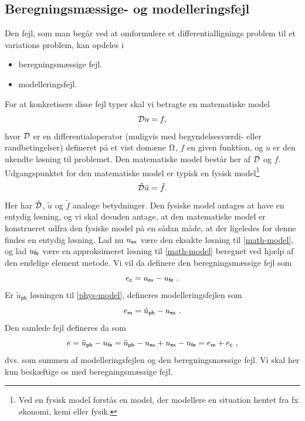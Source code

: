 \subsection{Beregningsmæssige- og modelleringsfejl}
Den fejl, som man begår ved at omformulere et differentiallignings
problem til et variations problem, kan opdeles i 
\begin{itemize}
  \item beregningsmæssige fejl.
  \item modelleringsfejl.
\end{itemize}
For at konkretisere disse fejl typer skal vi betragte en matematiske model
\begin{equation} \label{math-model}
  {\mathcal{D}} u=f,
\end{equation}
hvor ${\mathcal{D}}$ er en differentialoperator (muligvis med begyndelsesværdi-
eller rand\-be\-tin\-gel\-ser) defineret på et vist domæne $\Omega$, $f$ en 
given funktion, og $u$ er den ukendte løsning til problemet. Den 
matematiske model består her af ${\mathcal{D}}$ og $f$. Udgangspunktet for den
matematiske model er typisk en fysisk model\footnote{Ved en fysisk
model forstås en model, der modellere en situation hentet fra fx
økonomi, kemi eller fysik.}
\begin{equation} \label{phys-model}
  \tilde{{\mathcal{D}}} \tilde{u} = \tilde{f}.
\end{equation}
Her har $\tilde{{\mathcal{D}}}$, $\tilde{u}$ og $\tilde{f}$ analoge betydninger.
Den fysiske model antages at have en entydig løsning, og vi skal
desuden antage, at den matematiske model er konstrueret udfra den
fysiske model på en sådan måde, at der ligeledes for denne findes en
entydig løsning. Lad nu $u_{\mathsf{ex}}$ være den eksakte løsning til
\eqref{math-model}, og lad $u_{\mathsf{fe}}$ være en approksimeret 
løsning til \eqref{math-model} beregnet ved hjælp af den endelige 
element metode. Vi vil da definere den beregningsmæssige fejl som
\begin{equation}
  e_{\mathsf{c}} = \uex - \ufe\ .
\end{equation}
Er $\tilde{u}_{\mathsf{ph}}$ løsningen til \eqref{phys-model}, 
defineres modelleringsfejlen som 
\begin{equation}
  e_{\mathsf{m}} = \tilde{u}_{\mathsf{ph}} - u_{\mathsf{ex}}\ .
\end{equation}
Den samlede fejl defineres da som 
\begin{equation}
  e=\tilde{u}_{\mathsf{ph}}-u_{\mathsf{fe}}=\tilde{u}_{\mathsf{ph}}-u_{\mathsf{ex}}+u_{\mathsf{ex}}-u_{\mathsf{fe}}
  =e_{\mathsf{m}} + e_{\mathsf{c}}\ ,
\end{equation}
dvs. som summen af modelleringsfejlen og den beregningsmæssige fejl.
Vi skal her  kun beskæftige os med beregningsmæssige fejl. 

